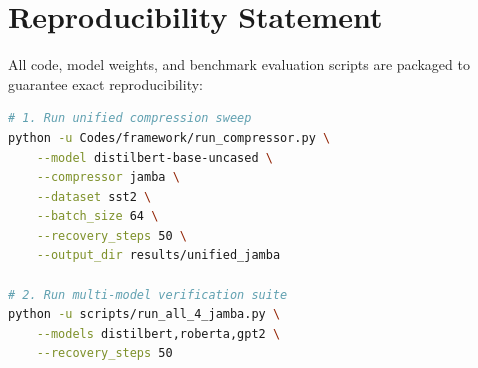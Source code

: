\section{Reproducibility Statement}
All code, model weights, and benchmark evaluation scripts are packaged to guarantee exact reproducibility:
\begin{lstlisting}[language=bash]
# 1. Run unified compression sweep
python -u Codes/framework/run_compressor.py \
    --model distilbert-base-uncased \
    --compressor jamba \
    --dataset sst2 \
    --batch_size 64 \
    --recovery_steps 50 \
    --output_dir results/unified_jamba

# 2. Run multi-model verification suite
python -u scripts/run_all_4_jamba.py \
    --models distilbert,roberta,gpt2 \
    --recovery_steps 50
\end{lstlisting}
